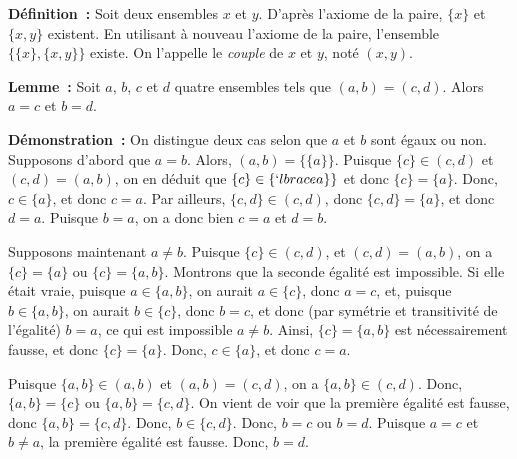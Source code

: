 \noindent\textbf{Définition :} Soit deux ensembles $x$ et $y$. D'après l'axiome de la paire, $\lbrace x \rbrace$ et $\lbrace x, y \rbrace$ existent. En utilisant à nouveau l'axiome de la paire, l'ensemble $\lbrace \lbrace x \rbrace, \lbrace x, y \rbrace \rbrace$ existe. On l'appelle le \textit{couple} de $x$ et $y$, noté $(x,y)$. 

\medskip

\noindent\textbf{Lemme :} Soit $a$, $b$, $c$ et $d$ quatre ensembles tels que $(a,b) = (c,d)$.
    Alors $a = c$ et $b = d$.

\medskip

\noindent\textbf{Démonstration :} On distingue deux cas selon que $a$ et $b$ sont égaux ou non. 
    Supposons d'abord que $a=b$. Alors, $(a,b) = \lbrace \lbrace a \rbrace \rbrace$. 
    Puisque $\lbrace c \rbrace \in (c,d)$ et $(c,d) = (a,b)$, on en déduit que $\lbrace c \rbrace \in \lbrace `lbrace a \rbrace \rbrace$ et donc $\lbrace c \rbrace = \lbrace a \rbrace$.
    Donc, $c \in \lbrace a \rbrace$, et donc $c = a$.
    Par ailleurs, $\lbrace c, d \rbrace \in (c,d)$, donc $\lbrace c, d \rbrace = \lbrace a \rbrace$, et donc $d = a$.
    Puisque $b = a$, on a donc bien $c = a$ et $d = b$.
    
    Supposons maintenant $a \neq b$.
    Puisque $\lbrace c \rbrace \in (c,d)$, et $(c,d) = (a,b)$, on a $\lbrace c \rbrace = \lbrace a \rbrace$ ou $\lbrace c \rbrace = \lbrace a, b \rbrace$.
    Montrons que la seconde égalité est impossible. 
    Si elle était vraie, puisque $a \in \lbrace a, b \rbrace$, on aurait $a \in \lbrace c \rbrace$, donc $a = c$, et, puisque $b \in \lbrace a,b \rbrace$, on aurait $b \in \lbrace c \rbrace$, donc $b = c$, et donc (par symétrie et transitivité de l'égalité) $b = a$, ce qui est impossible $a \neq b$.
    Ainsi, $\lbrace c \rbrace = \lbrace a, b \rbrace$ est nécessairement fausse, et donc $\lbrace c \rbrace = \lbrace a \rbrace$. 
    Donc, $c \in \lbrace a \rbrace$, et donc $c = a$. 
    
    Puisque $\lbrace a,b \rbrace \in (a,b)$ et $(a,b)=(c,d)$, on a $\lbrace a,b \rbrace \in (c,d)$.
    Donc, $\lbrace a,b \rbrace = \lbrace c \rbrace$ ou $\lbrace a,b \rbrace = \lbrace c, d \rbrace$.
    On vient de voir que la première égalité est fausse, donc $\lbrace a,b \rbrace = \lbrace c, d \rbrace$.
    Donc, $b \in \lbrace c, d \rbrace$. 
    Donc, $b = c$ ou $b = d$. 
    Puisque $a = c$ et $b \neq a$, la première égalité est fausse. 
    Donc, $b = d$. 

   \done 

